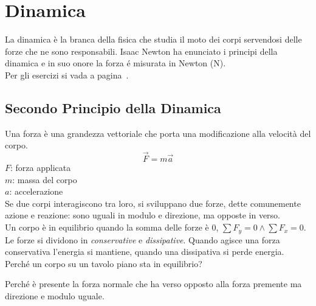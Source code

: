 
\section{Dinamica}\label{sec:dinamica}
La dinamica è la branca della fisica che studia il moto dei corpi servendosi delle forze che ne
sono responsabili. Isaac Newton ha enunciato i principi della dinamica e in suo onore la forza é 
misurata in Newton (N).\\
Per gli esercizi si vada a pagina~\pageref{ex:dinamica}.
\subsection{Secondo Principio della Dinamica}
Una forza è una grandezza vettoriale che porta una modificazione alla velocità del corpo.
\begin{equation*}
  \vec{F} = m\vec{a}
\end{equation*}
$F$: forza applicata\\
$m$: massa del corpo\\
$a$: accelerazione\\ [\baselineskip]
Se due corpi interagiscono tra loro, si sviluppano due forze, dette comunemente azione e reazione: 
sono uguali in modulo e direzione, ma opposte in verso.\\
Un corpo è in equilibrio quando la somma delle forze è 0, $\sum F_y = 0\land\sum F_x = 0$.\\
Le forze si dividono in \emph{conservative} e \emph{dissipative}. Quando agisce una forza conservativa
l'energia si mantiene, quando una dissipativa si perde energia.\\ [\baselineskip]
Perché un corpo su un tavolo piano sta in equilibrio?
\begin{center}
\end{center}
Perché è presente la forza normale che ha verso opposto alla forza premente ma direzione e modulo 
uguale.

